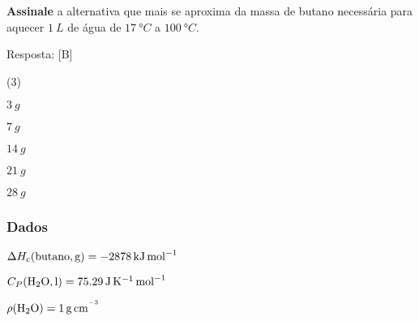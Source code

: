 \documentclass[braun, twocolumn]{braun}
\begin{document}
\begin{problem}
[2A27]\textbf{Assinale} a alternativa que mais se aproxima da massa de butano
necessária para aquecer \(\qty{1}{L}\) de água de \(\qty{17}{\degree C}\) a
\(\qty{100}{\degree C}\).

Resposta: {[}B{]}


\begin{choices}
(3)
\item \(\qty{3}{g}\)

\item \(\qty{7}{g}\)

\item \(\qty{14}{g}\)

\item \(\qty{21}{g}\)

\item \(\qty{28}{g}\)

\end{choices}
\subsubsection*{Dados}


\begin{datalist}

\item $\Delta H_\text{c}(\ce{butano, {g}}) = \qty{-2878}{kJ.mol^{-1}}$
\item $C_P(\ce{H2O, {l}}) = \qty{75,29}{J.K^{-1}.mol^{-1}}$
\item $\rho(\ce{H2O}) = \qty{1}{g.cm^{^{-3}}}$
\end{datalist}

\end{problem}
\end{document}
